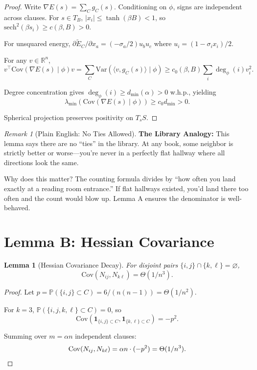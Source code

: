 \documentclass[11pt,a4paper]{article}
\theoremstyle{plain}
\newtheorem{lemma}[theorem]{Lemma}
\theoremstyle{definition}
\theoremstyle{remark}
\newtheorem{remark}[theorem]{Remark}
\newcommand{\R}{\mathbb{R}}
\newcommand{\Prob}{\mathbb{P}}
\newcommand{\Cov}{\mathrm{Cov}}
\newcommand{\Var}{\mathrm{Var}}
\begin{document}
\begin{proof}
Write $\nabla E(s) = \sum_C g_C(s)$. Conditioning on $\phi$, signs are independent across clauses. For $s \in T_B$, $|x_i| \leq \tanh(\beta B) < 1$, so $\mathrm{sech}^2(\beta s_i) \geq c(\beta, B) > 0$.

For unsquared energy, $\partial \widetilde{E}_C / \partial x_a = (-\sigma_a/2) u_b u_c$ where $u_i = (1 - \sigma_i x_i)/2$.

For any $v \in \R^n$,
\[
v^\top \Cov(\nabla E(s) \mid \phi) v = \sum_C \Var(\langle v, g_C(s) \rangle \mid \phi) \geq c_0(\beta, B) \sum_i \deg_\phi(i) v_i^2.
\]

Degree concentration gives $\deg_\phi(i) \geq d_{\min}(\alpha) > 0$ w.h.p., yielding
\[
\lambda_{\min}(\Cov(\nabla E(s) \mid \phi)) \geq c_0 d_{\min} > 0.
\]

Spherical projection preserves positivity on $T_s S$.
\end{proof}

\begin{remark}[Plain English: No Ties Allowed]
\textbf{The Library Analogy:} This lemma says there are no ``ties'' in the library. At any book, some neighbor is strictly better or worse---you're never in a perfectly flat hallway where all directions look the same.

Why does this matter? The counting formula divides by ``how often you land exactly at a reading room entrance.'' If flat hallways existed, you'd land there too often and the count would blow up. Lemma A ensures the denominator is well-behaved.
\end{remark}

\section{Lemma B: Hessian Covariance}

\begin{lemma}[Hessian Covariance Decay]
\label{lem:hessian-cov}
For disjoint pairs $\{i,j\} \cap \{k,\ell\} = \varnothing$,
\[
\Cov(N_{ij}, N_{k\ell}) = \Theta(1/n^3).
\]
\end{lemma}

\begin{proof}
Let $p = \Prob(\{i,j\} \subset C) = 6/(n(n-1)) = \Theta(1/n^2)$.

For $k = 3$, $\Prob(\{i,j,k,\ell\} \subset C) = 0$, so
\[
\Cov(\mathbf{1}_{\{i,j\} \subset C}, \mathbf{1}_{\{k,\ell\} \subset C}) = -p^2.
\]

Summing over $m = \alpha n$ independent clauses:
\[
\Cov(N_{ij}, N_{k\ell}) = \alpha n \cdot (-p^2) = \Theta(1/n^3). \qedhere
\]
\end{proof}
\end{document}
